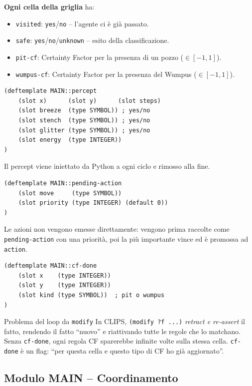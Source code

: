 \documentclass[12pt,a4paper]{article}
\begin{document}
\textbf{Ogni cella della griglia} ha:
\begin{itemize}[noitemsep]
  \item \texttt{visited}: \texttt{yes}/\texttt{no} -- l'agente ci è già passato.
  \item \texttt{safe}: \texttt{yes}/\texttt{no}/\texttt{unknown} -- esito della classificazione.
  \item \texttt{pit-cf}: Certainty Factor per la presenza di un pozzo ($\in [-1, 1]$).
  \item \texttt{wumpus-cf}: Certainty Factor per la presenza del Wumpus ($\in [-1, 1]$).
\end{itemize}

\begin{lstlisting}
(deftemplate MAIN::percept
    (slot x)      (slot y)      (slot steps)
    (slot breeze  (type SYMBOL)) ; yes/no
    (slot stench  (type SYMBOL)) ; yes/no
    (slot glitter (type SYMBOL)) ; yes/no
    (slot energy  (type INTEGER))
)
\end{lstlisting}

Il percept viene iniettato da Python a ogni ciclo e rimosso alla fine.

\begin{lstlisting}
(deftemplate MAIN::pending-action
    (slot move     (type SYMBOL))
    (slot priority (type INTEGER) (default 0))
)
\end{lstlisting}

Le azioni non vengono emesse direttamente: vengono prima raccolte come
\texttt{pending-action} con una priorità, poi la più importante vince
ed è promossa ad \texttt{action}.

\begin{lstlisting}
(deftemplate MAIN::cf-done
    (slot x    (type INTEGER))
    (slot y    (type INTEGER))
    (slot kind (type SYMBOL))  ; pit o wumpus
)
\end{lstlisting}

\begin{warnbox}{Problema del loop da \texttt{modify}}
In CLIPS, \texttt{(modify ?f ...)} \emph{retract e re-assert} il fatto, rendendo
il fatto ``nuovo'' e riattivando tutte le regole che lo matchano. Senza
\texttt{cf-done}, ogni regola CF sparerebbe infinite volte sulla stessa cella.
\texttt{cf-done} è un flag: ``per questa cella e questo tipo di CF ho già aggiornato''.
\end{warnbox}

\subsection{Modulo MAIN -- Coordinamento}
\end{document}
